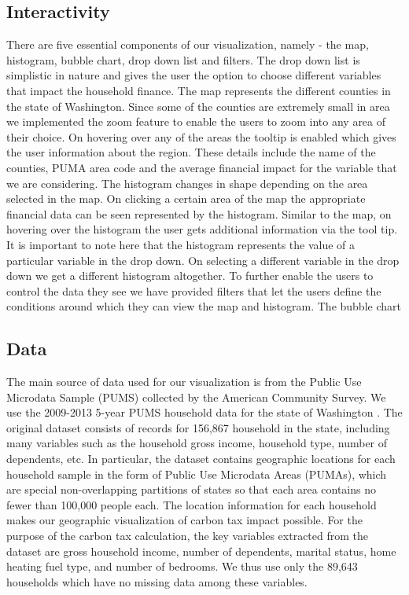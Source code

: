 \documentclass{sigchi}
\begin{document}
\subsection{Interactivity}
There are five essential components of our visualization, namely - the map, histogram, bubble chart, drop down list and filters.
The drop down list is simplistic in nature and gives the user the option to choose different variables that impact the household finance.
The map represents the different counties in the state of Washington. Since some of the counties are extremely small in area we implemented the zoom feature to enable the users to zoom into any area of their choice. On hovering over any of the areas the tooltip is enabled which gives the user information about the region. These details include the name of the counties, PUMA area code and the average financial impact for the variable that we are considering.
The histogram changes in shape depending on the area selected in the map. On clicking a certain area of the map the appropriate financial data can be seen represented by the histogram. Similar to the map, on hovering over the histogram the user gets additional information via the tool tip. It is important to note here that the histogram represents the value of a particular variable in the drop down. On selecting a different variable in the drop down we get a different histogram altogether.
To further enable the users to control the data they see we have provided filters that let the users define the conditions around which they can view the map and histogram.
The bubble chart  


\subsection{Data}
The main source of data used for our visualization is from the Public Use Microdata Sample (PUMS) collected by the American Community Survey. We use the 2009-2013 5-year PUMS household data for the state of Washington \cite{pums} . The original dataset consists of records for 156,867 household in the state, including many variables such as the household gross income, household type, number of dependents, etc. In particular, the dataset contains geographic locations for each household sample in the form of Public Use Microdata Areas (PUMAs), which are special non-overlapping partitions of states so that each area contains no fewer than 100,000 people each. The location information for each household makes our geographic visualization of carbon tax impact possible. For the purpose of the carbon tax calculation, the key variables extracted from the dataset are gross household income, number of dependents, marital status, home heating fuel type, and number of bedrooms. We thus use only the 89,643 households which have no missing data among these variables. \\
\end{document}
